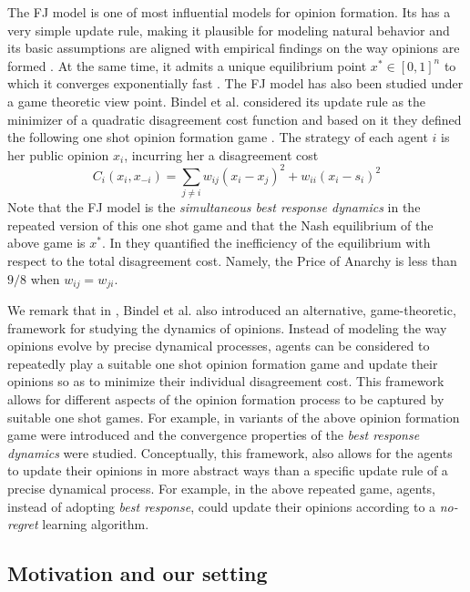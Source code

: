 The FJ model is one of most influential models for opinion formation.  Its has
a very simple update rule, making it plausible for modeling natural behavior
and its basic assumptions are aligned with empirical findings on the way
opinions are formed \cite{AFH05,K47}.  At the same time, it admits a unique
equilibrium point $x^* \in [0,1]^n$ to which it converges exponentially fast
\cite{GS14}.  The FJ model has also been studied under a game theoretic view
point.  Bindel et al. considered its update rule as the minimizer of a
quadratic disagreement cost function and based on it they defined the following
one shot opinion formation game \cite{BKO11}. The strategy of each agent $i$ is
her public opinion $x_i$, incurring her a disagreement cost
%
\begin{equation}\label{eq:BKO_cost}
  C_i(x_i,x_{-i})= \sum_{j \neq i}w_{ij} (x_i-x_j)^2 + w_{ii}(x_i-s_i)^2
\end{equation}
%
Note that the FJ model is the \emph{simultaneous best response dynamics} in the
repeated version of this one shot game and that the Nash equilibrium of the
above game is $x^*$. In \cite{BKO11} they quantified the inefficiency of the
equilibrium with respect to the total disagreement cost. Namely, the Price of
Anarchy is less than $9/8$ when $w_{ij}=w_{ji}$.

We remark that in \cite{BKO11}, Bindel et al. also introduced an alternative,
game-theoretic, framework for studying the dynamics of opinions.  Instead of
modeling the way opinions evolve by precise dynamical processes, agents can be
considered to repeatedly play a suitable one shot opinion formation game and
update their opinions so as to minimize their individual disagreement cost.
This framework allows for different aspects of the opinion formation process to
be captured by suitable one shot games.  For example, in \cite{BGM13,EFHS17}
variants of the above opinion formation game were introduced and the
convergence properties of the \emph{best response dynamics} were studied.
Conceptually, this framework, also allows for the agents to update their
opinions in more abstract ways than a specific update rule of a precise
dynamical process.  For example, in the above repeated game, agents, instead of
adopting \emph{best response}, could update their opinions according to a
\emph{no-regret} learning algorithm.

\subsection{Motivation and our setting}

